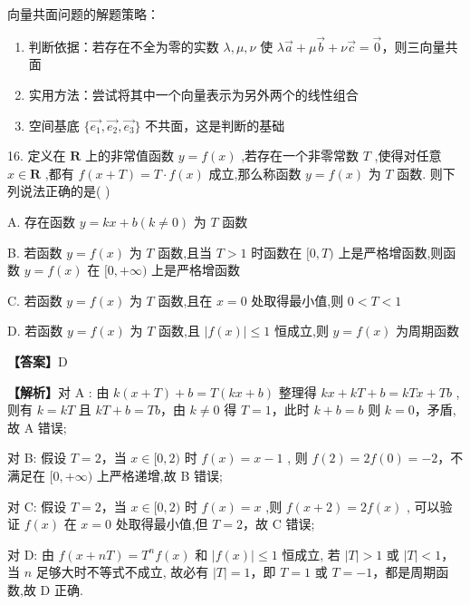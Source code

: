 \documentclass[10pt]{article}
\begin{document}
\begin{tipbox}[教学提示]
向量共面问题的解题策略：
\begin{enumerate}
\item 判断依据：若存在不全为零的实数 \(\lambda, \mu, \nu\) 使 \(\lambda\vec{a} + \mu\vec{b} + \nu\vec{c} = \vec{0}\)，则三向量共面
\item 实用方法：尝试将其中一个向量表示为另外两个的线性组合
\item 空间基底 \(\{\vec{e_1}, \vec{e_2}, \vec{e_3}\}\) 不共面，这是判断的基础
\end{enumerate}
\end{tipbox}

16. 定义在 \(\mathbf{R}\) 上的非常值函数 \(y = f\left( x\right)\) ,若存在一个非零常数 \(T\) ,使得对任意 \(x \in  \mathbf{R}\) ,都有 \(f\left( {x + T}\right)  = T \cdot  f\left( x\right)\) 成立,那么称函数 \(y = f\left( x\right)\) 为 \(T\) 函数. 则下列说法正确的是( )

A. 存在函数 \(y = {kx} + b\left( {k \neq  0}\right)\) 为 \(T\) 函数

B. 若函数 \(y = f\left( x\right)\) 为 \(T\) 函数,且当 \(T > 1\) 时函数在 \(\lbrack 0,T)\) 上是严格增函数,则函数 \(y = f\left( x\right)\) 在 \(\lbrack 0, + \infty )\) 上是严格增函数

C. 若函数 \(y = f\left( x\right)\) 为 \(T\) 函数,且在 \(x = 0\) 处取得最小值,则 \(0 < T < 1\)

D. 若函数 \(y = f\left( x\right)\) 为 \(T\) 函数,且 \(\left| {f\left( x\right) }\right|  \leq  1\) 恒成立,则 \(y = f\left( x\right)\) 为周期函数

\textbf{【答案】}D

\textbf{【解析】}对 \(\mathrm{A}\) : 由 \(k(x+T) + b = T(kx + b)\) 整理得 \(kx + kT + b = kTx + Tb\) ,
则有 \(k = kT\) 且 \(kT + b = Tb\)，由 \(k \neq 0\) 得 \(T = 1\)，此时 \(k + b = b\) 则 \(k = 0\)，矛盾,故 A 错误;

对 B: 假设 \(T = 2\)，当 \(x \in \lbrack 0,2)\) 时 \(f(x) = x - 1\) ,
则 \(f(2) = 2f(0) = -2\)，不满足在 \(\lbrack 0, +\infty)\) 上严格递增,故 B 错误;

对 C: 假设 \(T = 2\)，当 \(x \in \lbrack 0,2)\) 时 \(f(x) = x\) ,则 \(f(x+2) = 2f(x)\) ,
可以验证 \(f(x)\) 在 \(x = 0\) 处取得最小值,但 \(T = 2\)，故 C 错误;

对 D: 由 \(f(x + nT) = T^n f(x)\) 和 \(|f(x)| \leq 1\) 恒成立,
若 \(|T| > 1\) 或 \(|T| < 1\)，当 \(n\) 足够大时不等式不成立,
故必有 \(|T| = 1\)，即 \(T = 1\) 或 \(T = -1\)，都是周期函数,故 D 正确.
\end{document}

